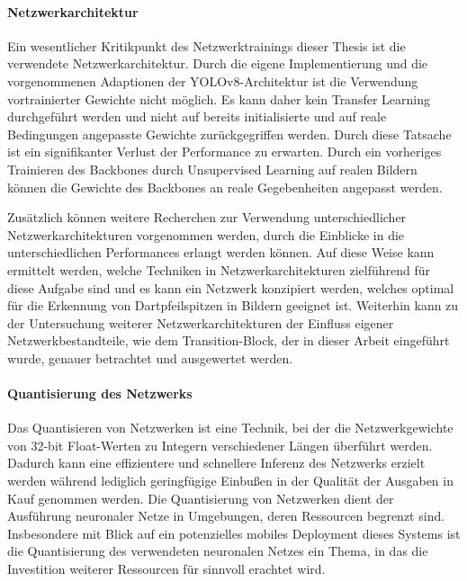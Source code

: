 \paragraph{Netzwerkarchitektur}

Ein wesentlicher Kritikpunkt des Netzwerktrainings dieser Thesis ist die verwendete Netzwerkarchitektur. Durch die eigene Implementierung und die vorgenommenen Adaptionen der YOLOv8-Architektur ist die Verwendung vortrainierter Gewichte nicht möglich. Es kann daher kein Transfer Learning durchgeführt werden und nicht auf bereits initialisierte und auf reale Bedingungen angepasste Gewichte zurückgegriffen werden. Durch diese Tatsache ist ein signifikanter Verlust der Performance zu erwarten. Durch ein vorheriges Trainieren des Backbones durch Unsupervised Learning auf realen Bildern können die Gewichte des Backbones an reale Gegebenheiten angepasst werden.

Zusätzlich können weitere Recherchen zur Verwendung unterschiedlicher Netzwerkarchitekturen vorgenommen werden, durch die Einblicke in die unterschiedlichen Performances erlangt werden können. Auf diese Weise kann ermittelt werden, welche Techniken in Netzwerkarchitekturen zielführend für diese Aufgabe sind und es kann ein Netzwerk konzipiert werden, welches optimal für die Erkennung von Dartpfeilspitzen in Bildern geeignet ist. Weiterhin kann zu der Untersuchung weiterer Netzwerkarchitekturen der Einfluss eigener Netzwerkbestandteile, wie dem Transition-Block, der in dieser Arbeit eingeführt wurde, genauer betrachtet und ausgewertet werden.


\paragraph{Quantisierung des Netzwerks}

Das Quantisieren von Netzwerken ist eine Technik, bei der die Netzwerkgewichte von 32-bit Float-Werten zu Integern verschiedener Längen überführt werden. Dadurch kann eine effizientere und schnellere Inferenz des Netzwerks erzielt werden während lediglich geringfügige Einbußen in der Qualität der Ausgaben in Kauf genommen werden. Die Quantisierung von Netzwerken dient der Ausführung neuronaler Netze in Umgebungen, deren Ressourcen begrenzt sind. Insbesondere mit Blick auf ein potenzielles mobiles Deployment dieses Systems ist die Quantisierung des verwendeten neuronalen Netzes ein Thema, in das die Investition weiterer Ressourcen für sinnvoll erachtet wird.

